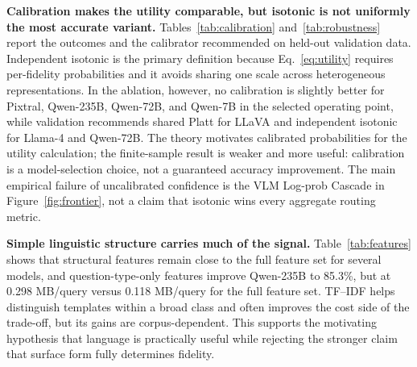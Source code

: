 \documentclass[10pt,conference]{IEEEtran}
\newcommand{\tableformat}{\footnotesize\setlength{\tabcolsep}{3.5pt}\renewcommand{\arraystretch}{0.95}}
\begin{document}
\begin{table}[t]
\centering
\tableformat
\caption{Calibration, feature, and template-holdout stress results. Main and
template columns are accuracy (\%); ``Struct only'' removes TF--IDF. The final
column is the validation-recommended calibrator.}
\label{tab:robustness}
\resizebox{\columnwidth}{!}{}
\end{table}

\begin{table}[t]
\centering
\tableformat
\caption{Calibration ablation as accuracy (\%)/MB per query. Each variant uses
the same split and validation-only operating-point rule.}
\label{tab:calibration}
\resizebox{\columnwidth}{!}{}
\end{table}

\noindent\textbf{Calibration makes the utility comparable, but isotonic is not
uniformly the most accurate variant.} Tables~\ref{tab:calibration}
and~\ref{tab:robustness} report the outcomes and the calibrator recommended on
held-out validation data. Independent isotonic is the
primary definition because Eq.~\ref{eq:utility} requires per-fidelity
probabilities and it avoids sharing one scale across heterogeneous
representations. In the ablation, however, no calibration is slightly better
for Pixtral, Qwen-235B, Qwen-72B, and Qwen-7B in the selected operating point,
while validation recommends shared Platt for LLaVA and independent isotonic for
Llama-4 and Qwen-72B. The theory motivates calibrated probabilities for the
utility calculation; the finite-sample result is weaker and more useful:
calibration is a model-selection choice, not a guaranteed accuracy improvement.
The main empirical failure of uncalibrated confidence is the VLM Log-prob
Cascade in Figure~\ref{fig:frontier}, not a claim that isotonic wins every
aggregate routing metric.

\begin{table}[t]
\centering
\tableformat
\caption{Linguistic feature ablation as accuracy (\%)/MB per query. Structural
features exclude TF--IDF; type-only retains only broad question form.}
\label{tab:features}
\resizebox{\columnwidth}{!}{}
\end{table}

\noindent\textbf{Simple linguistic structure carries much of the signal.}
Table~\ref{tab:features} shows that structural features remain close to the
full feature set for several models, and question-type-only features improve
Qwen-235B to 85.3\%, but at 0.298 MB/query versus 0.118 MB/query for the full
feature set. TF--IDF helps distinguish templates within a broad class and often
improves the cost side of the trade-off, but its gains are corpus-dependent.
This supports the motivating hypothesis that language is practically useful
while rejecting the stronger claim that surface form fully determines fidelity.
\end{document}
